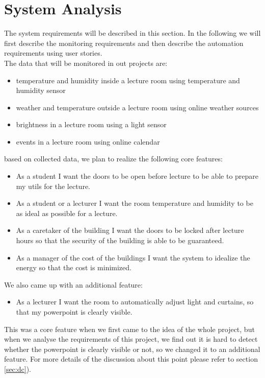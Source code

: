 \documentclass[runningheads]{llncs}
\begin{document}
\section{System Analysis}
\label{sec:sysa}
The system requirements will be described in this section. In the following we will first describe the monitoring requirements and then describe the automation requirements using user stories.\\

The data that will be monitored in out projects are:
\begin{itemize}
\item temperature and humidity inside a lecture room using temperature and humidity sensor
\item weather and temperature outside a lecture room using online weather sources
\item brightness in a lecture room using a light sensor
\item events in a lecture room using online calendar
\end{itemize}

based on collected data, we plan to realize the following core features:
\begin{itemize}
\item As a student I want the doors to be open before lecture to be able to prepare my utils for the lecture.\\
\item As a student or a lecturer I want the room temperature and humidity to be as ideal as possible for a lecture.
\item As a caretaker of the building I want the doors to be locked after lecture hours so that the security of the building is able to be guaranteed. 
\item As a manager of the cost of the buildings I want the system to idealize the energy so that the cost is minimized.
\end{itemize}

We also came up with an additional feature:
\begin{itemize}
\item As a lecturer I want the room to automatically adjust light and curtains, so that my powerpoint is clearly visible.
\end{itemize}
This was a core feature when we first came to the idea of the whole project, but when we analyse the requirements of this project, we find out it is hard to detect whether the powerpoint is clearly visible or not, so we changed it to an additional feature. For more details of the discussion about this point please refer to section \ref{sec:dc}).
\end{document}
